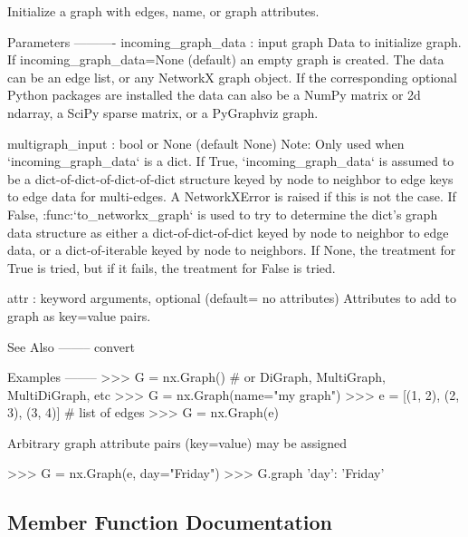 \begin{DoxyVerb}Initialize a graph with edges, name, or graph attributes.

Parameters
----------
incoming_graph_data : input graph
    Data to initialize graph.  If incoming_graph_data=None (default)
    an empty graph is created.  The data can be an edge list, or any
    NetworkX graph object.  If the corresponding optional Python
    packages are installed the data can also be a NumPy matrix
    or 2d ndarray, a SciPy sparse matrix, or a PyGraphviz graph.

multigraph_input : bool or None (default None)
    Note: Only used when `incoming_graph_data` is a dict.
    If True, `incoming_graph_data` is assumed to be a
    dict-of-dict-of-dict-of-dict structure keyed by
    node to neighbor to edge keys to edge data for multi-edges.
    A NetworkXError is raised if this is not the case.
    If False, :func:`to_networkx_graph` is used to try to determine
    the dict's graph data structure as either a dict-of-dict-of-dict
    keyed by node to neighbor to edge data, or a dict-of-iterable
    keyed by node to neighbors.
    If None, the treatment for True is tried, but if it fails,
    the treatment for False is tried.

attr : keyword arguments, optional (default= no attributes)
    Attributes to add to graph as key=value pairs.

See Also
--------
convert

Examples
--------
>>> G = nx.Graph()  # or DiGraph, MultiGraph, MultiDiGraph, etc
>>> G = nx.Graph(name="my graph")
>>> e = [(1, 2), (2, 3), (3, 4)]  # list of edges
>>> G = nx.Graph(e)

Arbitrary graph attribute pairs (key=value) may be assigned

>>> G = nx.Graph(e, day="Friday")
>>> G.graph
{'day': 'Friday'}\end{DoxyVerb}
 

\subsection{Member Function Documentation}
\mbox{\label{classnetworkx_1_1classes_1_1multidigraph_1_1MultiDiGraph_ab9967eefa32e2aba30bbc8efb08522e7}} 
